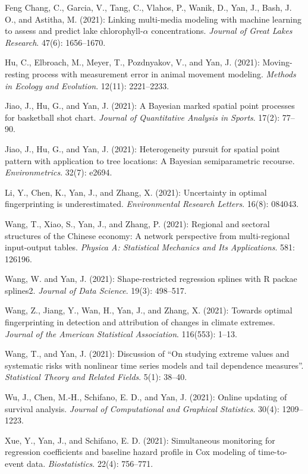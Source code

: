 \documentclass[Statistics]{vita}
\begin{document}
\begin{vita}
\begin{Publications}
\begin{RefereedJournalArticles}
  \item Feng Chang, C., Garcia, V., Tang, C., Vlahos, P., Wanik, D., Yan, J., Bash, J. O., and Astitha, M. (2021): Linking multi-media modeling with machine learning to assess and predict lake chlorophyll-$\alpha$ concentrations. {\em Journal of Great Lakes Research\/}. 47(6): 1656--1670.
  \item *Hu, C., Elbroach, M., Meyer, T., Pozdnyakov, V., and Yan, J. (2021): Moving-resting process with measurement error in animal movement modeling. {\em Methods in Ecology and Evolution\/}. 12(11): 2221--2233.
  \item *Jiao, J., Hu, G., and Yan, J. (2021): A Bayesian marked spatial point processes for basketball shot chart. {\em Journal of Quantitative Analysis in Sports\/}. 17(2): 77--90. 
  \item *Jiao, J., Hu, G., and Yan, J. (2021): Heterogeneity pursuit for spatial point pattern with application to tree locations: A Bayesian semiparametric recourse. {\em Environmetrics\/}. 32(7): e2694.
  \item *Li, Y., Chen, K., Yan, J., and Zhang, X. (2021): Uncertainty in optimal fingerprinting is underestimated. {\em Environmental Research Letters\/}. 16(8): 084043.
  \item *Wang, T., Xiao, S., Yan, J., and Zhang, P. (2021): Regional and sectoral structures of the Chinese economy: A network perspective from multi-regional input-output tables. {\em Physica A: Statistical Mechanics and Its Applications\/}. 581: 126196.
  \item *Wang, W. and Yan, J. (2021): Shape-restricted regression splines with R packae splines2. {\em Journal of Data Science\/}. 19(3): 498--517.
  \item *Wang, Z., Jiang, Y., Wan, H., Yan, J., and Zhang, X. (2021): Towards optimal fingerprinting in detection and attribution of changes in climate extremes. {\em Journal of the American Statistical Association\/}. 116(553): 1--13.
  \item Wang, T., and Yan, J. (2021): Discussion of ``On studying extreme values and systematic risks with nonlinear time series models and tail dependence measures''. {\em Statistical Theory and Related Fields\/}. 5(1): 38--40.
  \item *Wu, J., Chen, M.-H., Schifano, E. D., and Yan, J. (2021): Online updating of survival analysis. {\em Journal of Computational and Graphical Statistics\/}. 30(4): 1209--1223.
  \item *Xue, Y., Yan, J., and Schifano, E. D. (2021): Simultaneous monitoring for regression coefficients and baseline hazard profile in Cox modeling of time-to-event data. {\em Biostatistics\/}. 22(4): 756--771.

\end{RefereedJournalArticles}
\end{Publications}
\end{vita}
\end{document}
